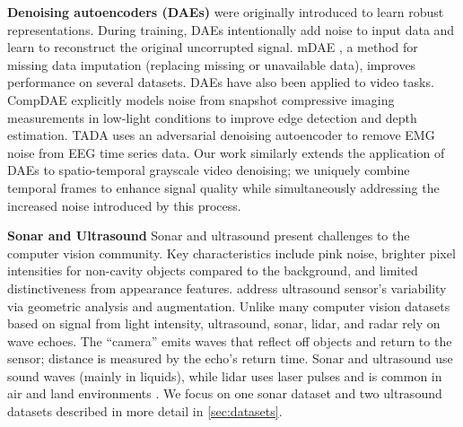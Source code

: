 \noindent{}\textbf{Denoising autoencoders (DAEs)} were originally introduced to learn robust representations. During training, DAEs intentionally add noise to input data and learn to reconstruct the original uncorrupted signal. mDAE \cite{mDAE}, a method for missing data imputation (replacing missing or unavailable data), improves performance on several datasets. 
DAEs have also been applied to video tasks. CompDAE \cite{compDAE} explicitly models noise from snapshot compressive imaging measurements in low-light conditions to improve edge detection and depth estimation. TADA \cite{Choi2025TADA} uses an adversarial denoising autoencoder to remove EMG noise from EEG time series data. Our work similarly extends the application of DAEs to spatio-temporal grayscale video denoising; we uniquely combine temporal frames to enhance signal quality while simultaneously addressing the increased noise introduced by this process.


\textbf{Sonar and Ultrasound}
Sonar and ultrasound present challenges to the computer vision community. Key characteristics include pink noise, brighter pixel intensities for non-cavity objects compared to the background, and limited distinctiveness from appearance features. \citet{weld2025standardisationconvexultrasounddata} address ultrasound sensor's variability via geometric analysis and augmentation. Unlike many computer vision datasets based on signal from light intensity, ultrasound, sonar,  lidar, and radar rely on wave echoes. The ``camera'' emits waves that reflect off objects and return to the sensor; distance is measured by the echo's return time. Sonar and ultrasound use sound waves (mainly in liquids), while lidar uses laser pulses and is common in air and land environments \cite{Geiger2013VisionMR, caesar2020nuscenes, chang2019argoverse}. We focus on one sonar dataset and two ultrasound datasets described in more detail in \cref{sec:datasets}. 

